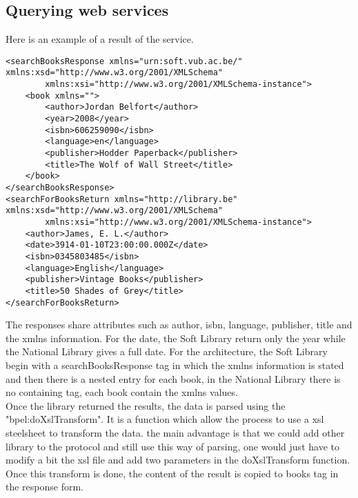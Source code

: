 \documentclass[a4paper,10pt]{article}
\begin{document}
\subsection{Querying web services}
Here is an example of a result of the service.
\begin{verbatim}
<searchBooksResponse xmlns="urn:soft.vub.ac.be/" xmlns:xsd="http://www.w3.org/2001/XMLSchema"
        xmlns:xsi="http://www.w3.org/2001/XMLSchema-instance">
    <book xmlns="">
        <author>Jordan Belfort</author>
        <year>2008</year>
        <isbn>606259090</isbn>
        <language>en</language>
        <publisher>Hodder Paperback</publisher>
        <title>The Wolf of Wall Street</title>
    </book>
</searchBooksResponse>
<searchForBooksReturn xmlns="http://library.be" xmlns:xsd="http://www.w3.org/2001/XMLSchema" 
        xmlns:xsi="http://www.w3.org/2001/XMLSchema-instance">
    <author>James, E. L.</author>
    <date>3914-01-10T23:00:00.000Z</date>
    <isbn>0345803485</isbn>
    <language>English</language>
    <publisher>Vintage Books</publisher>
    <title>50 Shades of Grey</title>
</searchForBooksReturn>
\end{verbatim}
The responses share attributes such as author, isbn, language, publisher, title and the xmlns information. For the date, the Soft Library return only the year while the National Library gives a full date. For the architecture, the Soft Library begin with a searchBooksResponse tag in which the xmlns information is stated and then there is a nested entry for each book, in the National Library there is no containing tag, each book contain the xmlns values.\\

Once the library returned the results, the data is parsed using the "bpel:doXslTransform". It is a function which allow the process to use a xsl steelsheet to transform the data. the main advantage is that we could add other library to the protocol and still use this way of parsing, one would just have to modify a bit the xsl file and add two parameters in the doXslTransform function. Once this transform is done, the content of the result is copied to books tag in the response form.
\end{document}
